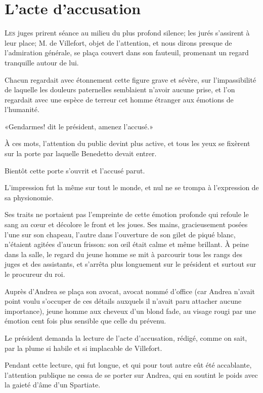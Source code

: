 \chapter{L'acte d'accusation}

\lettrine{L}{es} juges prirent séance au milieu du plus profond silence; les jurés s'assirent à leur place; M. de Villefort, objet de l'attention, et nous dirons presque de l'admiration générale, se plaça couvert dans son fauteuil, promenant un regard tranquille autour de lui. 

Chacun regardait avec étonnement cette figure grave et sévère, sur l'impassibilité de laquelle les douleurs paternelles semblaient n'avoir aucune prise, et l'on regardait avec une espèce de terreur cet homme étranger aux émotions de l'humanité. 

«Gendarmes! dit le président, amenez l'accusé.» 

À ces mots, l'attention du public devint plus active, et tous les yeux se fixèrent sur la porte par laquelle Benedetto devait entrer. 

Bientôt cette porte s'ouvrit et l'accusé parut. 

L'impression fut la même sur tout le monde, et nul ne se trompa à l'expression de sa physionomie. 

Ses traits ne portaient pas l'empreinte de cette émotion profonde qui refoule le sang au cœur et décolore le front et les joues. Ses mains, gracieusement posées l'une sur son chapeau, l'autre dans l'ouverture de son gilet de piqué blanc, n'étaient agitées d'aucun frisson: son œil était calme et même brillant. À peine dans la salle, le regard du jeune homme se mit à parcourir tous les rangs des juges et des assistants, et s'arrêta plus longuement sur le président et surtout sur le procureur du roi. 

Auprès d'Andrea se plaça son avocat, avocat nommé d'office (car Andrea n'avait point voulu s'occuper de ces détails auxquels il n'avait paru attacher aucune importance), jeune homme aux cheveux d'un blond fade, au visage rougi par une émotion cent fois plus sensible que celle du prévenu. 

Le président demanda la lecture de l'acte d'accusation, rédigé, comme on sait, par la plume si habile et si implacable de Villefort. 

Pendant cette lecture, qui fut longue, et qui pour tout autre eût été accablante, l'attention publique ne cessa de se porter sur Andrea, qui en soutint le poids avec la gaieté d'âme d'un Spartiate. 


